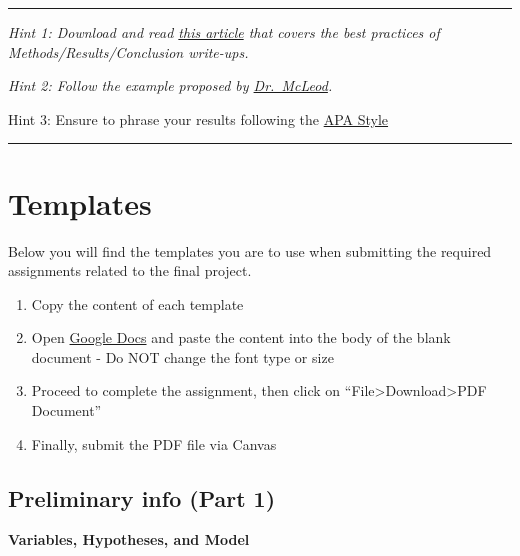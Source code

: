 \documentclass[
]{article}
\providecommand{\tightlist}{%
  \setlength{\itemsep}{0pt}\setlength{\parskip}{0pt}}
\begin{document}
\begin{center}\rule{0.5\linewidth}{0.5pt}\end{center}

\emph{Hint 1: Download and read \href{https://bit.ly/31skJ5I}{this article} that covers the best practices of Methods/Results/Conclusion write-ups.}

\emph{Hint 2: Follow the example proposed by \href{https://bit.ly/3fptZzD}{Dr.~McLeod}.}

Hint 3: Ensure to phrase your results following the \href{https://bit.ly/2HirVLv}{APA Style}

\begin{center}\rule{0.5\linewidth}{0.5pt}\end{center}

\hypertarget{templates}{%
\section{Templates}\label{templates}}

Below you will find the templates you are to use when submitting the required assignments related to the final project.

\begin{enumerate}
\def\labelenumi{\arabic{enumi}.}
\tightlist
\item
  Copy the content of each template
\item
  Open \href{http://docs.google.com}{Google Docs} and paste the content into the body of the blank document - Do NOT change the font type or size
\item
  Proceed to complete the assignment, then click on ``File\textgreater Download\textgreater PDF Document''
\item
  Finally, submit the PDF file via Canvas
\end{enumerate}

\hypertarget{preliminary-info-part-1}{%
\subsection{Preliminary info (Part 1)}\label{preliminary-info-part-1}}

\textbf{Variables, Hypotheses, and Model}
\end{document}
